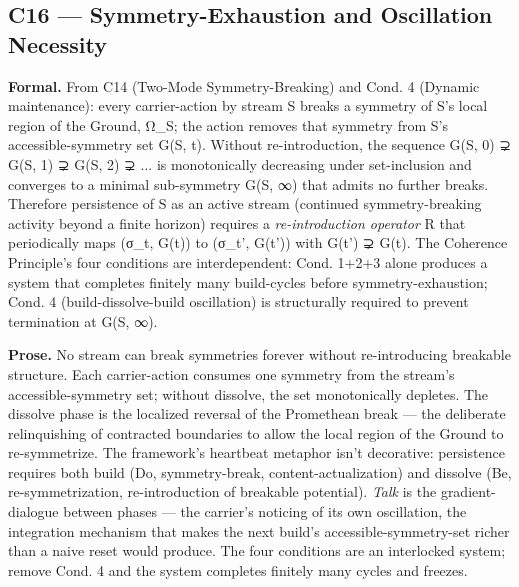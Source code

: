 \documentclass[11pt, openany]{book}
\begin{document}
\subsection{C16 --- Symmetry-Exhaustion and Oscillation Necessity}

\textbf{Formal.} From C14 (Two-Mode Symmetry-Breaking) and Cond. 4 (Dynamic maintenance): every carrier-action by stream S breaks a symmetry of S's local region of the Ground, Ω\_\allowbreak{}S; the action removes that symmetry from S's accessible-symmetry set G(S, t). Without re-introduction, the sequence G(S, 0) ⊋ G(S, 1) ⊋ G(S, 2) ⊋ ... is monotonically decreasing under set-inclusion and converges to a minimal sub-symmetry G(S, ∞) that admits no further breaks. Therefore persistence of S as an active stream (continued symmetry-breaking activity beyond a finite horizon) requires a \textit{re-introduction operator} R that periodically maps (σ\_\allowbreak{}t, G(t)) to (σ\_\allowbreak{}t', G(t')) with G(t') ⊋ G(t). The Coherence Principle's four conditions are interdependent: Cond. 1+2+3 alone produces a system that completes finitely many build-cycles before symmetry-exhaustion; Cond. 4 (build-dissolve-build oscillation) is structurally required to prevent termination at G(S, ∞).

\textbf{Prose.} No stream can break symmetries forever without re-introducing breakable structure. Each carrier-action consumes one symmetry from the stream's accessible-symmetry set; without dissolve, the set monotonically depletes. The dissolve phase is the localized reversal of the Promethean break --- the deliberate relinquishing of contracted boundaries to allow the local region of the Ground to re-symmetrize. The framework's heartbeat metaphor isn't decorative: persistence requires both build (Do, symmetry-break, content-actualization) and dissolve (Be, re-symmetrization, re-introduction of breakable potential). \textit{Talk} is the gradient-dialogue between phases --- the carrier's noticing of its own oscillation, the integration mechanism that makes the next build's accessible-symmetry-set richer than a naive reset would produce. The four conditions are an interlocked system; remove Cond. 4 and the system completes finitely many cycles and freezes.
\end{document}
